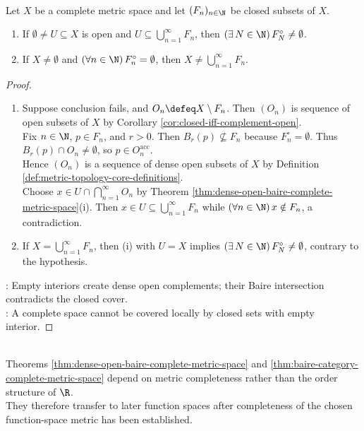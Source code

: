 \begin{corollary} \label{cor:baire-closed-cover-has-interior} \\
Let $X$ be a complete metric space and let $(F_n)_{n\in\N}$ be closed subsets of $X$.
\begin{enumerate}[label=(\roman*)]
\setlength{\itemsep}{0pt}
\item If $\emptyset\ne U\subseteq X$ is open and $U\subseteq\bigcup\limits_{n=1}^{\infty}F_n$, then $(\exists\,N\in\N)\,F_N^\circ\ne\emptyset$.
\item If $X\ne\emptyset$ and $(\forall n\in\N)\,F_n^\circ=\emptyset$, then $X\ne\bigcup\limits_{n=1}^{\infty}F_n$.
\end{enumerate}
\begin{proof}
\begin{enumerate}[label=(\roman*)]
\setlength{\itemsep}{0pt}
\item[$(i)$] Suppose conclusion fails, and $O_n\defeq X\setminus F_n$. Then $(O_n)$ is sequence of open subsets of $X$ by Corollary \ref{cor:closed-iff-complement-open}.\\
Fix $n\in\N$, $p\in F_n$, and $r>0$. Then $B_r(p)\nsubseteq F_n$ because $F_n^\circ=\emptyset$. Thus $B_r(p)\cap O_n\ne\emptyset$, so $p\in O_n^{\operatorname{acc}}$.\\
Hence $(O_n)$ is a sequence of dense open subsets of $X$ by Definition \ref{def:metric-topology-core-definitions}.\\
Choose $x\in U\cap\bigcap\limits_{n=1}^{\infty}O_n$ by Theorem \ref{thm:dense-open-baire-complete-metric-space}(i). Then $x\in U\subseteq\bigcup\limits_{n=1}^{\infty}F_n$ while $(\forall n\in\N)\,x\notin F_n$, a contradiction.
\item[$(ii)$] If $X=\bigcup\limits_{n=1}^{\infty}F_n$, then (i) with $U=X$ implies $(\exists\,N\in\N)\,F_N^\circ\ne\emptyset$, contrary to the hypothesis.
\end{enumerate}
: Empty interiors create dense open complements; their Baire intersection contradicts the closed cover.\\
: A complete space cannot be covered locally by closed sets with empty interior.
\end{proof}
\end{corollary}

\begin{perspective} \label{per:baire-category-in-function-spaces} \\
Theorems \ref{thm:dense-open-baire-complete-metric-space} and \ref{thm:baire-category-complete-metric-space} depend on metric completeness rather than the order structure of $\R$.\\
They therefore transfer to later function spaces after completeness of the chosen function-space metric has been established.
\end{perspective}

